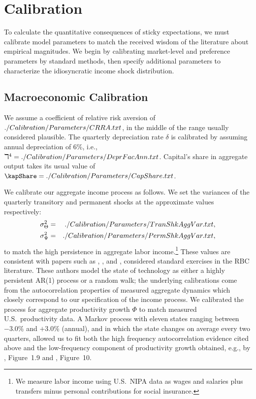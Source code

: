 \documentclass[titlepage]{\econtex}\newcommand{\texname}{cAndCwithStickyE}
\begin{document}
\section{Calibration}\label{sec:calibration}

To calculate the quantitative consequences of sticky expectations, we must calibrate model parameters to match the received wisdom of the literature about empirical magnitudes.  We begin by calibrating market-level and preference parameters by standard methods, then specify additional parameters to characterize the idiosyncratic income shock distribution.

\subsection{Macroeconomic Calibration}
\label{sec:MacroCal}

We assume a coefficient of relative risk aversion of
$
 ./Calibration/Parameters/CRRA.txt
$, in the middle of the range usually considered plausible. %
The quarterly depreciation rate $\delta$ is calibrated by assuming annual depreciation of 6\%,
i.e.,
$
\daleth^{4}=  ./Calibration/Parameters/DeprFacAnn.txt
$.  Capital's share in aggregate output takes its usual value of
$
\kapShare=  \ParmDir/CapShare.txt
$.

We calibrate our aggregate income process as follows. We set the variances of the quarterly transitory and permanent shocks at the approximate values respectively:
\begin{eqnarray*}
   \sigma^{2}_{\Theta} & = &  ./Calibration/Parameters/TranShkAggVar.txt ,
\\ \sigma^{2}_{\Psi}  & =  &  ./Calibration/Parameters/PermShkAggVar.txt ,
\end{eqnarray*}
to match the high persistence in aggregate labor income.\footnote{We measure labor income using U.S.\ NIPA data as wages and salaries plus transfers minus personal contributions for social insurance.} These values are consistent with papers such as \cite{jermannProduction}, \cite{bcfHabits}, and \cite{ckmCritique}, considered standard exercises in the RBC literature. These authors model the state of technology as either a highly persistent AR(1) process or a random walk; the underlying calibrations come from the autocorrelation properties of measured aggregate dynamics which closely correspond to our specification of the income process.  We calibrated the process for aggregate productivity growth $\Phi$ to match measured U.S.\ productivity data.  A Markov process with eleven states ranging between $-3.0\%$ and $+3.0\%$ (annual), and in which the state changes on average every two quarters, allowed us to fit both the high frequency autocorrelation evidence cited above and the low-frequency component of productivity growth obtained, e.g., by \cite{sswNAIRU}, Figure~1.9 and \cite{fernald:disappointingRecovery}, Figure~10.
\end{document}
